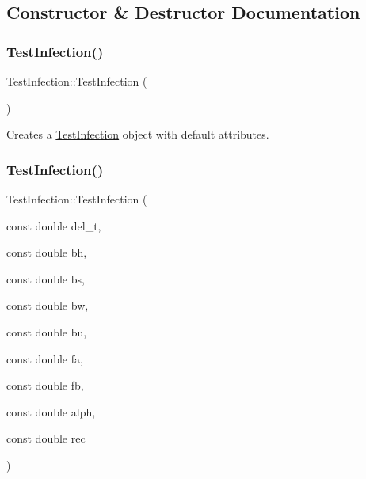 \subsection{Constructor \& Destructor Documentation}
\mbox{\label{classTestInfection_abda0511d1b6a0b63d7dec65857201c7a}} 
\subsubsection{\texorpdfstring{Test\+Infection()}{TestInfection()}\hspace{0.1cm}{\footnotesize\ttfamily [1/2]}}
{\footnotesize\ttfamily Test\+Infection\+::\+Test\+Infection (\begin{DoxyParamCaption}{ }\end{DoxyParamCaption})\hspace{0.3cm}{\ttfamily [default]}}



Creates a \hyperlink{classTestInfection}{Test\+Infection} object with default attributes. 

\mbox{\label{classTestInfection_a95e12afdd2b23350b7453c5b81d63720}} 
\subsubsection{\texorpdfstring{Test\+Infection()}{TestInfection()}\hspace{0.1cm}{\footnotesize\ttfamily [2/2]}}
{\footnotesize\ttfamily Test\+Infection\+::\+Test\+Infection (\begin{DoxyParamCaption}\item[{const double}]{del\+\_\+t,  }\item[{const double}]{bh,  }\item[{const double}]{bs,  }\item[{const double}]{bw,  }\item[{const double}]{bu,  }\item[{const double}]{fa,  }\item[{const double}]{fb,  }\item[{const double}]{alph,  }\item[{const double}]{rec }\end{DoxyParamCaption})\hspace{0.3cm}{\ttfamily [inline]}}




